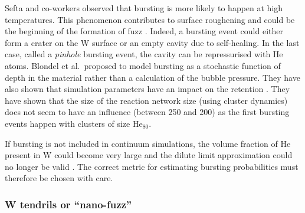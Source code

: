 Sefta and co-workers observed that \gls{bursting} is more likely to happen at high temperatures.
This phenomenon contributes to surface roughening and could be the beginning of the formation of \gls{fuzz} .
Indeed, a \gls{bursting} event could either form a crater on the \gls{W} surface or an empty cavity due to self-healing.
In the last case, called a \textit{pinhole} \gls{bursting} event, the cavity can be repressurised with \gls{He} atoms.
Blondel et al.\ proposed to model \gls{bursting} as a stochastic function of depth in the material rather than a calculation of the bubble pressure.
They have also shown that simulation parameters have an impact on the \gls{retention} .
They have shown that the size of the reaction network size (using cluster dynamics) does not seem to have an influence (between 250 and 200) as the first bursting events happen with clusters of size $\text{He}_{80}$.

If \gls{bursting} is not included in continuum simulations, the volume fraction of \gls{He} present in \gls{W} could become very large and the dilute limit approximation could no longer be valid .
The correct metric for estimating \gls{bursting} probabilities must therefore be chosen with care.

\subsubsection{W tendrils or ``nano-fuzz''}

